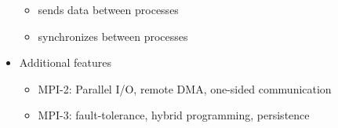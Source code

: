 \begin{frame}[fragile,label=ss-charm]
\begin{minipage}[t]{2.50in}
\begin{itemize}
  \begin{itemize}
  \item sends data between processes
  \item synchronizes between processes
  \end{itemize} \pause
\item Additional features
\begin{itemize}
\item MPI-2: Parallel I/O, remote DMA,
one-sided communication
\item MPI-3: fault-tolerance, hybrid programming, persistence
\end{itemize}
\end{itemize}
\end{minipage}
\end{frame}



